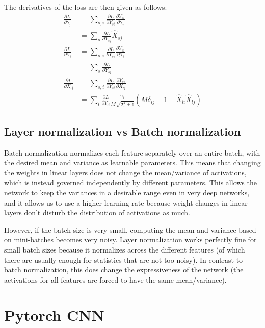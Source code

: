 \documentclass{article}
\newcommand{\pd}[2]{\frac{\partial #1}{\partial #2}}
\begin{document}
The derivatives of the loss are then given as follows:
\begin{align*}
  \pd{L}{\gamma_j} &= \sum_{s, i}\pd{L}{Y_{si}}\pd{Y_{si}}{\gamma_j}\\
                   &= \sum_s \pd{L}{Y_{sj}} \hat{X}_{sj}\\
  \pd{L}{\beta_j} &= \sum_{s, i}\pd{L}{Y_{si}}\pd{Y_{si}}{\beta_j}\\
                   &= \sum_s \pd{L}{Y_{sj}}\\
  \pd{L}{X_{lj}} &= \sum_{s, i}\pd{L}{Y_{si}}\pd{Y_{si}}{X_{lj}}\\
  &= \sum_i \pd{L}{Y_{li}} \frac{\gamma_i}{M\sqrt{\sigma_l^2 + \epsilon}}\left(M \delta_{ij} - 1 - \hat{X}_{li}\hat{X}_{lj}\right)
\end{align*}

\subsection{Layer normalization vs Batch normalization}
Batch normalization normalizes each feature separately over an entire batch,
with the desired mean and variance as learnable parameters. This means that
changing the weights in linear layers does not change the mean/variance
of activations, which is instead governed independently by different parameters.
This allows the network to keep the variances in a desirable range even in very
deep networks, and it allows us to use a higher learning rate because weight changes
in linear layers don't disturb the distribution of activations as much.

However, if the batch size is very small, computing the mean and variance based on
mini-batches becomes very noisy. Layer normalization works perfectly fine for
small batch sizes because it normalizes across the different features (of which there
are usually enough for statistics that are not too noisy). In contrast to batch normalization,
this does change the expressiveness of the network (the activations for all features
are forced to have the same mean/variance).

\section{Pytorch CNN}
\end{document}
